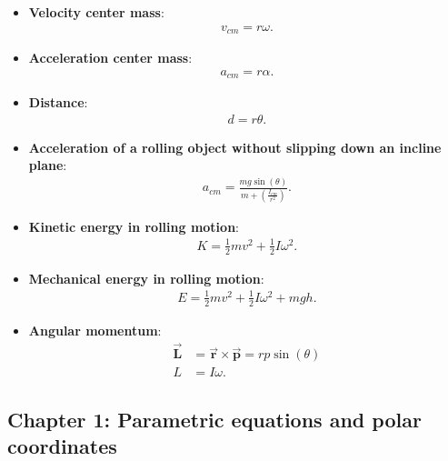 \documentclass{report}
\begin{document}
\begin{itemize}
        \item \textbf{Velocity center mass}:
            \begin{align*}
                v_{cm} = r\omega
            .\end{align*}
        \item \textbf{Acceleration center mass}:
            \begin{align*}
                a_{cm} = r\alpha
            .\end{align*}
        \item \textbf{Distance}:
            \begin{align*}
                d = r\theta 
            .\end{align*}
        \item \textbf{Acceleration of a rolling object without slipping down an incline plane}:
            \begin{align*}
                a_{cm} = \frac{mg\sin{\left(\theta \right)}}{m + \left(\frac{I_{cm}}{r^{2}}\right)}
            .\end{align*}
        \item \textbf{Kinetic energy in rolling motion}:
            \begin{align*}
                K = \frac{1}{2}mv^{2} + \frac{1}{2}I\omega^{2}
            .\end{align*}
        \item \textbf{Mechanical energy in rolling motion}:
            \begin{align*}
                E  = \frac{1}{2}mv^{2} + \frac{1}{2}I\omega^{2} + mgh
            .\end{align*}
        \item \textbf{Angular momentum}:
            \begin{align*}
                \vec{\mathbf{L}} &= \vec{\mathbf{r}} \times \vec{\mathbf{p}} = rp\sin{\left(\theta \right)} \\
                L &= I\omega
            .\end{align*}
    \end{itemize}

    \pagebreak 

    \bigbreak \noindent 
    \subsection{Chapter 1: Parametric equations and polar coordinates}
\end{document}
